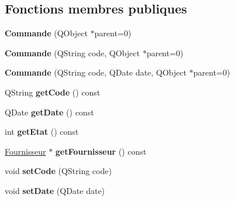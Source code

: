 \subsection*{Fonctions membres publiques}
\begin{DoxyCompactItemize}
\item 
\hypertarget{class_core_1_1_commande_a64cb1834d666c1ec9f6cb0f11b5f9c78}{
{\bfseries Commande} (QObject $\ast$parent=0)}
\label{d0/d92/class_core_1_1_commande_a64cb1834d666c1ec9f6cb0f11b5f9c78}

\item 
\hypertarget{class_core_1_1_commande_ad24bf970d58e268642a102650698ba6e}{
{\bfseries Commande} (QString code, QObject $\ast$parent=0)}
\label{d0/d92/class_core_1_1_commande_ad24bf970d58e268642a102650698ba6e}

\item 
\hypertarget{class_core_1_1_commande_ad9219981f0c67b8627924c422c968aa6}{
{\bfseries Commande} (QString code, QDate date, QObject $\ast$parent=0)}
\label{d0/d92/class_core_1_1_commande_ad9219981f0c67b8627924c422c968aa6}

\item 
\hypertarget{class_core_1_1_commande_af17d69972864c85cf980845772bc737f}{
QString {\bfseries getCode} () const }
\label{d0/d92/class_core_1_1_commande_af17d69972864c85cf980845772bc737f}

\item 
\hypertarget{class_core_1_1_commande_a89b8b550e9eeea14e5c7c81e06bf485a}{
QDate {\bfseries getDate} () const }
\label{d0/d92/class_core_1_1_commande_a89b8b550e9eeea14e5c7c81e06bf485a}

\item 
\hypertarget{class_core_1_1_commande_a3d2b4980b3472ac81e91be956a6ac537}{
int {\bfseries getEtat} () const }
\label{d0/d92/class_core_1_1_commande_a3d2b4980b3472ac81e91be956a6ac537}

\item 
\hypertarget{class_core_1_1_commande_a8b86b2723f049285eef734c72585e704}{
\hyperlink{class_core_1_1_fournisseur}{Fournisseur} $\ast$ {\bfseries getFournisseur} () const }
\label{d0/d92/class_core_1_1_commande_a8b86b2723f049285eef734c72585e704}

\item 
\hypertarget{class_core_1_1_commande_a81e784a1aedef144d76642d318b74b71}{
void {\bfseries setCode} (QString code)}
\label{d0/d92/class_core_1_1_commande_a81e784a1aedef144d76642d318b74b71}

\item 
\hypertarget{class_core_1_1_commande_af031ef6f31adc61a5f3377eda393de75}{
void {\bfseries setDate} (QDate date)}
\label{d0/d92/class_core_1_1_commande_af031ef6f31adc61a5f3377eda393de75}


\end{DoxyCompactItemize}
